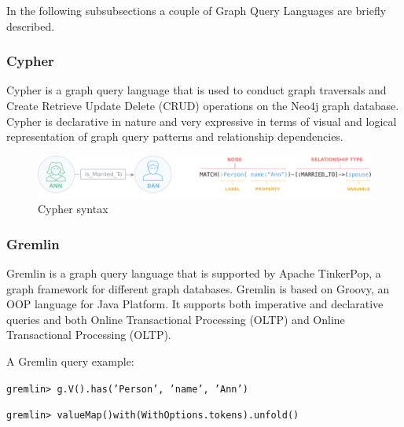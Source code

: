 In the following subsubsections a couple of Graph Query Languages are briefly described.

\subsubsection[Cypher]{Cypher} \label{subsubsection:LiteratureReview/ReviewofGraphDatabaseSystems/GraphQueryLanguages/Cypher}

Cypher is a graph query language that is used to conduct graph traversals and Create Retrieve Update Delete (CRUD) operations on the Neo4j graph database.
Cypher is declarative in nature and very expressive in terms of visual and logical representation of graph query patterns and relationship dependencies.

\begin{figure}[H]%
	\centering%
	\includegraphics[width=1\textwidth]{images/chapter2/cypher.pdf}%
	\caption[Cypher syntax]{Cypher syntax}%
	\label{fig:cypher}%
\end{figure}%

\subsubsection{Gremlin} \label{subsubsection:LiteratureReview/ReviewofGraphDatabaseSystems/GraphQueryLanguages/Gremlin}
Gremlin is a graph query language that is supported by Apache TinkerPop, a graph framework for different graph databases.
Gremlin is based on Groovy, an OOP language for
Java Platform.
It supports both imperative and declarative queries and both Online Transactional Processing (OLTP) and Online Transactional Processing (OLTP).

A Gremlin query example:

\noindent\colorbox{lightestgray}{
	\parbox{1\linewidth-9pt}{%
		\texttt{gremlin> g.V().has('Person', 'name', 'Ann')}
	}%
}%

\noindent\colorbox{lightestgray}{
	\parbox{1\linewidth-9pt}{%
		\texttt{gremlin> valueMap()with(WithOptions.tokens).unfold()}
	}%
}%

